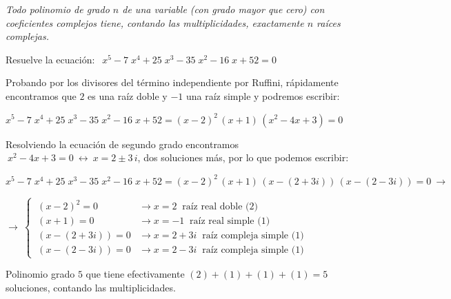 \begin{theorem}

\emph{Todo polinomio de grado $n$ de una variable (con grado mayor que cero) con coeficientes complejos tiene, contando las multiplicidades, exactamente $n$ raíces complejas.}	
\end{theorem}

\begin{miejemplo}

Resuelve la ecuación: $\ \ x^{5} - 7 \; x^{4} + 25 \; x^{3} - 35 \; x^{2} - 16 \; x + 52 = 0$

\vspace{4mm} Probando por los divisores del término independiente por Ruffini, rápidamente encontramos que $2$ es una raíz doble y $-1$ una raíz simple	 y podremos escribir:

\vspace{2mm} $x^{5} - 7 \; x^{4} + 25 \; x^{3} - 35 \; x^{2} - 16 \; x + 52 = (x-2)^2\, (x+1)\, (x^2-4x+3) = 0$

\vspace{2mm} Resolviendo la ecuación de segundo grado encontramos $\ x^2-4x+3 = 0 \ \leftrightarrow \ x=2\pm 3\, i$, dos soluciones más, por lo que podemos escribir:

\vspace{2mm}  $x^{5} - 7 \; x^{4} + 25 \; x^{3} - 35 \; x^{2} - 16 \; x + 52 = (x-2)^2\, (x+1)\, (x-(2+3i))\, (x-(2-3i)) = 0 \ \to $

\vspace{2mm} $\to \ \begin{cases}
\  (x-2)^2=0 &\to  x=2 \ \text{ raíz real doble (2)} \\
\  (x+1)=0 &\to   x=-1 \ \text{ raíz real simple (1)} \\
\ (x-(2+3i))=0 &\to x=2+3i \ \text{ raíz compleja simple (1)}  \\ 
\ (x-(2-3i))=0 &\to  x=2-3i \ \text{ raíz compleja simple (1)}	
 \end{cases}$

\vspace{2mm} Polinomio grado $5$ que tiene efectivamente $(2)+(1)+(1)+(1)=5$ soluciones, contando las multiplicidades.

\end{miejemplo}


